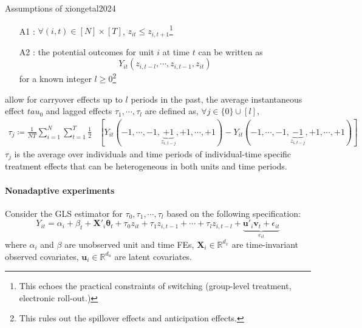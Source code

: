 \documentclass[twoside]{article}
\begin{document}
\begin{assumption}{Assumptions of \citet{xiong2024optimal}}{xiongetal2024}
    \begin{itemize}
        \item[A1] : $\forall (i,t)\in[N]\times [T]$, $z_{it}\leq z_{i,t+1}$\footnote{This echoes the practical constraints of switching (group-level treatment, electronic roll-out.)}
        \item[A2] : the potential outcomes for unit $i$ at time $t$ can be written as $$ Y_{it}(z_{i,t-l},\cdots,z_{i,t-1},z_{it}) $$ for a known integer $l\geq 0$\footnote{This rules out the spillover effects and anticipation effects.}
    \end{itemize}
\end{assumption}
\citet{xiong2024optimal} allow for carryover effects up to $l$ periods in the past, the average instantaneous effect $tau_0$ and lagged effects $\tau_1,\cdots,\tau_l$ are defined as, $\forall j \in \{0\}\cup [l]$,
\begin{align*}
    \tau_j \coloneq \frac{1}{NT}\sum^N_{i=1}\sum^T_{t=1} \frac{1}{2} & \left[ Y_{it}\left(-1,\cdots,-1,\underbrace{+1}_{z_{i,t-j}}, +1,\cdots,+1\right) -Y_{it}\left( -1,\cdots,-1,\underbrace{-1}_{z_{i,t-j}},+1,\cdots,+1 \right) \right]
\end{align*}
$\tau_j$ is the average over individuals and time periods of individual-time specific treatment effects that can be heterogeneous in both units and time periods.

\paragraph*{Nonadaptive experiments}
Consider the GLS estimator for $\tau_0,\tau_1,\cdots,\tau_l$ based on the following specification:
$$ Y_{it} = \alpha_i + \beta_t + \mathbf{X}'_i\boldsymbol{\theta}_t + \tau_0z_{it} + \tau_1z_{i,t-1} + \cdots + \tau_lz_{i,t-l} + \underbrace{\mathbf{u}'_i\mathbf{v}_t + \epsilon_{it}}_{e_{it}} $$
where $\alpha_i$ and $\beta$ are unobserved unit and time FEs, $\mathbf{X}_i\in\mathbb{R}^{d_x}$ are time-invariant observed covariates, $\mathbf{u}_i\in\mathbb{R}^{d_u}$ are latent covariates.
\end{document}
